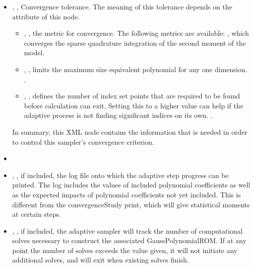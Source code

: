 \begin{itemize}
  \item {}, , Convergence
    tolerance.
    The meaning of this tolerance depends on the  attribute of this node.
    \begin{itemize}
      \item {}, , the metric for convergence.
        The following metrics are available: , which
        converges the sparse quadrature integration of the second moment of the model.%
      \item {}, ,
        limits the maximum size equivalent polynomial for any one dimension.
        .
      \item {}, , defines the number of
        index set points that are required to be found before calculation can exit.  Setting this to a higher
        value can help if the adaptive process is not finding significant indices on its own.
        .
    \end{itemize}
    In summary, this XML node contains the information that is needed in order
    to control this sampler's convergence criterion.
  \item \convergenceStudyDescription
  \item {}, ,
    if included, the log file onto which the adaptive step progress can be printed.  The log includes the
    values of included polynomial coefficients as well as the expected impacts of polynomial coefficients not
    yet included.  This is different from
    the convergenceStudy print, which will give statistical moments at certain steps.
  \item {}, ,
    if included, the adaptive sampler will track the number of computational solves necessary to construct the
    associated GaussPolynomialROM.  If at any point the number of solves exceeds the value given, it will not
    initiate any additional solves, and will exit when existing solves finish.
\end{itemize}
